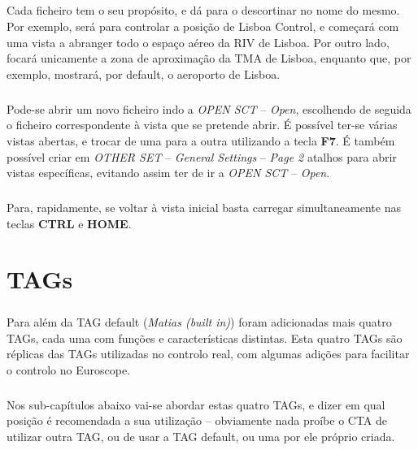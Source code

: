 \documentclass[10pt]{report}
\begin{document}
\paragraph{} Cada ficheiro tem o seu propósito, e dá para o descortinar no nome do mesmo. Por
exemplo,  será para controlar a posição de Lisboa Control, e começará com uma vista
a abranger todo o espaço aéreo da RIV de Lisboa. Por outro lado,  focará unicamente
a zona de aproximação da TMA de Lisboa, enquanto que, por exemplo,  mostrará, por
default, o aeroporto de Lisboa.

\paragraph{} Pode-se abrir um novo ficheiro  indo a \textit{OPEN SCT} – \textit{Open},
escolhendo de seguida o ficheiro correspondente à vista que se pretende abrir. É possível ter-se
várias vistas abertas, e trocar de uma para a outra utilizando a tecla \textbf{F7}. É também
possível criar em \textit{OTHER SET} – \textit{General Settings} – \textit{Page 2} atalhos para
abrir vistas específicas, evitando assim ter de ir a \textit{OPEN SCT} – \textit{Open}.

\paragraph{} Para, rapidamente, se voltar à vista inicial basta carregar simultaneamente nas teclas
\textbf{CTRL} e \textbf{HOME}.

\chapter{TAGs}

\paragraph{} Para além da TAG default (\textit{Matias (built in)}) foram adicionadas mais quatro
TAGs, cada uma com funções e características distintas. Esta quatro TAGs são réplicas das TAGs
utilizadas no controlo real, com algumas adições para facilitar o controlo no Euroscope.

\paragraph{} Nos sub-capítulos abaixo vai-se abordar estas quatro TAGs, e dizer em qual posição é
recomendada a sua utilização – obviamente nada proíbe o CTA de utilizar outra TAG, ou de usar a TAG
default, ou uma por ele próprio criada.
\end{document}
